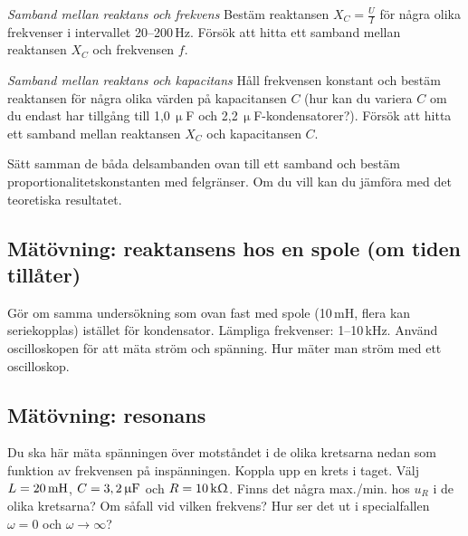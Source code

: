 \documentclass[a4paper,11pt]{article}
\begin{document}
\emph{Samband mellan reaktans och frekvens} Bestäm reaktansen 
$X_{C}=\frac{U}{I}$ för några olika frekvenser i intervallet 20--200\,Hz. Försök
att hitta ett samband mellan reaktansen $X_{C}$ och frekvensen $f$. 

\emph{Samband mellan reaktans och kapacitans} Håll frekvensen konstant
och bestäm reaktansen för några olika värden på kapacitansen $C$ (hur
kan du variera $C$ om du endast har tillgång till 1,0\,$\upmu$F och 
2,2\,$\upmu$F-kondensatorer?).  Försök att hitta ett samband mellan
reaktansen $X_{C}$ och kapacitansen $C$.

Sätt samman de båda delsambanden ovan till ett samband och bestäm 
proportionalitetskonstanten med felgränser. Om du vill kan du jämföra med det teoretiska resultatet.





\subsection*{Mätövning: reaktansens hos en spole (om tiden tillåter)}

Gör om samma undersökning som ovan fast med spole (10\,mH, flera kan 
seriekopplas) istället för 
kondensator.  Lämpliga frekvenser: 1--10\,kHz. Använd oscilloskopen för att mäta ström och spänning. Hur mäter man ström med ett oscilloskop.

\subsection*{Mätövning: resonans}

Du ska här mäta spänningen över motståndet i de olika kretsarna nedan som
funktion av frekvensen på inspänningen. Koppla upp en krets i taget. Välj
$L=\unit[20]{mH}$, $C=\unit[3,2]{\upmu F}$ och $R=\unit[10]{k\Upomega}$. Finns
det några max./min. hos $u_R$ i de olika kretsarna? Om såfall vid vilken frekvens? Hur ser det ut i specialfallen $\omega = 0$ och $\omega \rightarrow \infty$?

\begin{figure}[h]
	\centering
        \resizebox{0.65\textwidth}{!}{}
\end{figure}
\end{document}

